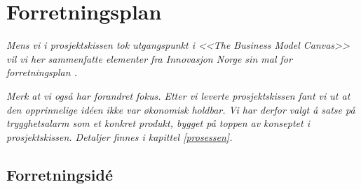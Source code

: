 %
%
%
%





\chapter{Forretningsplan}

\textit{Mens vi i prosjektskissen tok utgangspunkt i \textit{<<The Business
Model Canvas>>} \cite{osterwalder} vil vi her sammenfatte elementer fra
Innovasjon Norge sin mal for forretningsplan \cite{innovasjon.norge}.}

\textit{Merk at vi også har forandret fokus. Etter vi leverte prosjektskissen
  fant vi ut at den opprinnelige idéen ikke var økonomisk holdbar. Vi har
  derfor valgt å satse på trygghetsalarm som et konkret produkt, bygget på
  toppen av konseptet i prosjektskissen. Detaljer finnes i kapittel
\vref{prosessen}.}

\section{Forretningsidé}

